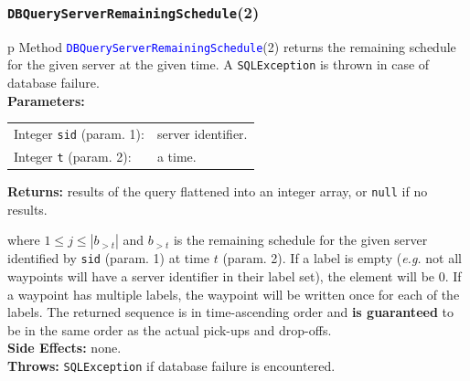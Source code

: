 \documentclass{article}
\theoremstyle{definition}                   %
\begin{document}
\subsubsection{{\tt{}\protect{}DBQueryServerRemainingSchedule}(2)}
\begin{tabular}{p{\textwidth}}
\toprule
{}
Method \textcolor{blue}{{\tt{}\protect{}DBQueryServerRemainingSchedule}}(2) returns the
remaining schedule for the given server at the given time.
A {\tt{}SQLException} is thrown in case of database failure.\\
\midrule
\textbf{Parameters:} \\
\begin{tabular}{lp{116mm}}
Integer {\tt{}sid} (param. 1):&server identifier.\\
Integer {\tt{}t} (param. 2):&a time.\\
\end{tabular}
\textbf{Returns:} results of the query flattened into an integer array,
or {\tt{}null} if no results.


where $1\leq j\leq |b_{>t}|$ and $b_{>t}$ is the remaining schedule for the
given server identified by {\tt{}sid} (param. 1) at time $t$ (param. 2).
If a label is empty (\textit{e.g.} not all waypoints will have a server
identifier in their label set), the element will be 0. If a waypoint has
multiple labels, the waypoint will be written once for each of the labels.
The returned sequence is in time-ascending order and \textbf{is guaranteed}
to be in the same order as the actual pick-ups and drop-offs.\\
\textbf{Side Effects:} none.\\
\textbf{Throws:} {\tt{}SQLException} if database failure is encountered.\\
\bottomrule
\end{tabular}
\end{document}
